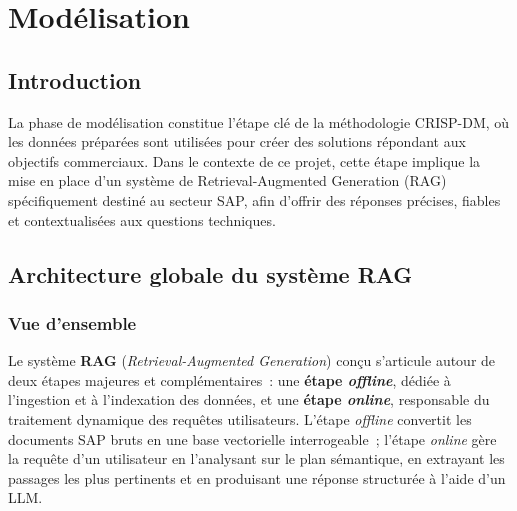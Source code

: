 
\chapter{Modélisation}
\section*{Introduction}
La phase de modélisation constitue l’étape clé de la méthodologie CRISP-DM, où les données préparées sont utilisées pour créer des solutions répondant aux objectifs commerciaux. Dans le contexte de ce projet, cette étape implique la mise en place d'un système de Retrieval-Augmented Generation (RAG) spécifiquement destiné au secteur SAP, afin d’offrir des réponses précises, fiables et contextualisées aux questions techniques.

%

\section{Architecture globale du syst\`{e}me RAG}


\subsection{Vue d'ensemble}

Le syst\`{e}me \textbf{RAG} (\textit{Retrieval-Augmented Generation}) con\c{c}u s'articule autour de deux
\'{e}tapes majeures et compl\'{e}mentaires~: une \textcolor{offlinecolor}{\textbf{\'{e}tape \textit{offline}}},
d\'{e}di\'{e}e \`{a} l'ingestion et \`{a} l'indexation des donn\'{e}es, et une
\textcolor{onlinecolor}{\textbf{\'{e}tape \textit{online}}}, responsable du traitement dynamique des
requ\^{e}tes utilisateurs. L'\'{e}tape \textit{offline} convertit les documents SAP bruts en une base
vectorielle interrogeable~; l'\'{e}tape \textit{online} g\`{e}re la requ\^{e}te d'un utilisateur en
l'analysant sur le plan s\'{e}mantique, en extrayant les passages les plus pertinents et en produisant
une r\'{e}ponse structur\'{e}e \`{a} l'aide d'un LLM.

